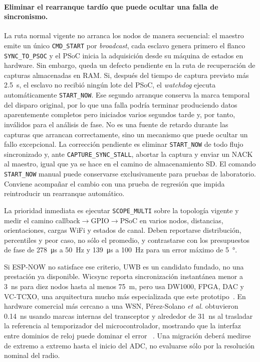 \paragraph{Eliminar el rearranque tard\'io que puede ocultar una falla de sincronismo.}
La ruta normal vigente no arranca los nodos de manera secuencial: el maestro emite un
\'unico \texttt{CMD\_START} por \emph{broadcast}, cada esclavo genera primero el flanco
\texttt{SYNC\_TO\_PSOC} y el PSoC inicia la adquisici\'on desde su m\'aquina de estados
en hardware. Sin embargo, queda un defecto pendiente en la ruta de recuperaci\'on de
capturas almacenadas en RAM. Si, despu\'es del tiempo de captura previsto m\'as
\SI{2.5}{\second}, el esclavo no recibi\'o ning\'un lote del PSoC, el \emph{watchdog}
ejecuta autom\'aticamente \texttt{START\_NOW}. Ese segundo arranque conserva la marca
temporal del disparo original, por lo que una falla podr\'ia terminar produciendo datos
aparentemente completos pero iniciados varios segundos tarde y, por tanto, inv\'alidos
para el an\'alisis de fase. No es una fuente de retardo durante las capturas que arrancan
correctamente, sino un mecanismo que puede ocultar un fallo excepcional. La correcci\'on
pendiente es eliminar \texttt{START\_NOW} de todo flujo sincronizado y, ante
\texttt{CAPTURE\_SYNC\_STALL}, abortar la captura y enviar un NACK al maestro, igual que
ya se hace en el camino de almacenamiento SD. El comando \texttt{START\_NOW} manual
puede conservarse exclusivamente para pruebas de laboratorio. Conviene acompa\~nar el
cambio con una prueba de regresi\'on que impida reintroducir un rearranque autom\'atico.

La prioridad inmediata es ejecutar \texttt{SCOPE\_MULTI} sobre la topolog\'ia vigente y
medir el camino callback$\to$GPIO$\to$PSoC en varios nodos, distancias, orientaciones,
cargas WiFi y estados de canal. Deben reportarse distribuci\'on, percentiles y peor caso,
no s\'olo el promedio, y contrastarse con los presupuestos de fase de
\SI{278}{\micro\second} a \SI{50}{\hertz} y \SI{139}{\micro\second} a
\SI{100}{\hertz} para un error m\'aximo de \SI{5}{\degree}.

Si ESP-NOW no satisface ese criterio, UWB es un candidato fundado, no una prestaci\'on ya
disponible. Wicsync reporta sincronizaci\'on instant\'anea menor a \SI{3}{\nano\second}
para diez nodos hasta al menos \SI{75}{\meter}, pero usa DW1000, FPGA, DAC y VC-TCXO,
una arquitectura mucho m\'as especializada que este prototipo~\cite{Xue2021Wicsync}. En
hardware comercial m\'as cercano a una WSN, P\'erez-Solano \emph{et al.} obtuvieron
\SI{0.14}{\nano\second} usando marcas internas del transceptor y alrededor de
\SI{31}{\nano\second} al trasladar la referencia al temporizador del microcontrolador,
mostrando que la interfaz entre dominios de reloj puede dominar el error
~\cite{PerezSolano2022UWB}. Una migraci\'on deber\'a medirse de extremo a extremo hasta el
inicio del ADC, no evaluarse s\'olo por la resoluci\'on nominal del radio.

